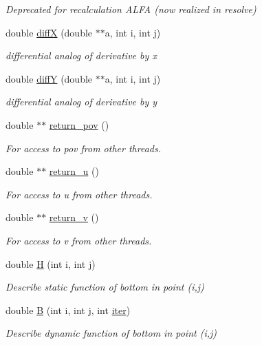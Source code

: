 \begin{DoxyCompactItemize}
\begin{DoxyCompactList}\small\item\em Deprecated for recalculation ALFA (now realized in resolve) \end{DoxyCompactList}\item 
double \hyperlink{classAlg_ab723793cded5d410eade7db32fe4a834}{diffX} (double $\ast$$\ast$a, int i, int j)
\begin{DoxyCompactList}\small\item\em differential analog of derivative by x \end{DoxyCompactList}\item 
double \hyperlink{classAlg_a986f8c7fc36030eda32e543d30d977ca}{diffY} (double $\ast$$\ast$a, int i, int j)
\begin{DoxyCompactList}\small\item\em differential analog of derivative by y \end{DoxyCompactList}\item 
double $\ast$$\ast$ \hyperlink{classAlg_a5763761a3053f1887e190633acccf0c2}{return\_\-pov} ()
\begin{DoxyCompactList}\small\item\em For access to pov from other threads. \end{DoxyCompactList}\item 
double $\ast$$\ast$ \hyperlink{classAlg_a94607ea61b791a6b6b468f15a1a090ab}{return\_\-u} ()
\begin{DoxyCompactList}\small\item\em For access to u from other threads. \end{DoxyCompactList}\item 
double $\ast$$\ast$ \hyperlink{classAlg_a181cf46ca43805230be57f7171ec9b55}{return\_\-v} ()
\begin{DoxyCompactList}\small\item\em For access to v from other threads. \end{DoxyCompactList}\item 
double \hyperlink{classAlg_a262fa430db2415621c8db3c5393e6258}{H} (int i, int j)
\begin{DoxyCompactList}\small\item\em Describe static function of bottom in point (i,j) \end{DoxyCompactList}\item 
double \hyperlink{classAlg_a3a4ae52d22f42babc6d6bf8759c27ec8}{B} (int i, int j, int \hyperlink{classAlg_a68d89159e07d755c5ec4235a10928674}{iter})
\begin{DoxyCompactList}\small\item\em Describe dynamic function of bottom in point (i,j) \end{DoxyCompactList}\item 
$$
\end{DoxyCompactItemize}
